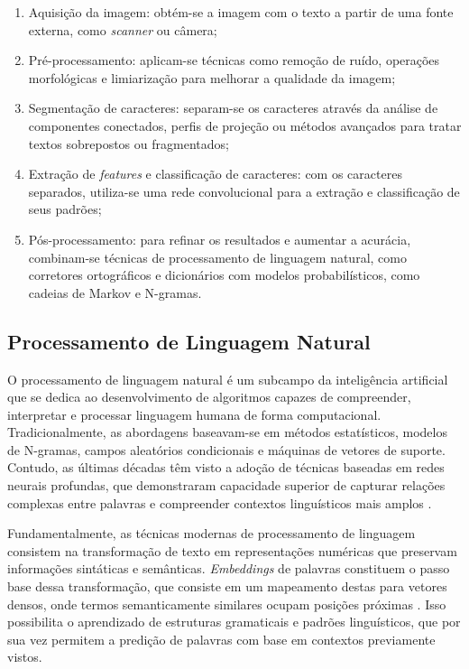 \begin{enumerate}
	\item Aquisição da imagem: obtém-se a imagem com o texto a partir de uma fonte externa, como \textit{scanner} ou câmera;
	\item Pré-processamento: aplicam-se técnicas como remoção de ruído, operações morfológicas e limiarização para melhorar a qualidade da imagem;
	\item Segmentação de caracteres: separam-se os caracteres através da análise de componentes conectados, perfis de projeção ou métodos avançados para tratar textos sobrepostos ou fragmentados;
	\item Extração de \textit{features} e classificação de caracteres: com os caracteres separados, utiliza-se uma rede convolucional para a extração e classificação de seus padrões;
	\item Pós-processamento: para refinar os resultados e aumentar a acurácia, combinam-se técnicas de processamento de linguagem natural, como corretores ortográficos e dicionários com modelos probabilísticos, como cadeias de Markov e N-gramas.
\end{enumerate}

\subsection{Processamento de Linguagem Natural}

O processamento de linguagem natural é um subcampo da inteligência artificial que se dedica ao desenvolvimento de algoritmos capazes de compreender, interpretar e processar linguagem humana de forma computacional. Tradicionalmente, as abordagens baseavam-se em métodos estatísticos, modelos de N-gramas, campos aleatórios condicionais e máquinas de vetores de suporte. Contudo, as últimas décadas têm visto a adoção de técnicas baseadas em redes neurais profundas, que demonstraram capacidade superior de capturar relações complexas entre palavras e compreender contextos linguísticos mais amplos \cite{nlp}.

Fundamentalmente, as técnicas modernas de processamento de linguagem consistem na transformação de texto em representações numéricas que preservam informações sintáticas e semânticas. \textit{Embeddings} de palavras constituem o passo base dessa transformação, que consiste em um mapeamento destas para vetores densos, onde termos semanticamente similares ocupam posições próximas \cite{nlp}. Isso possibilita o aprendizado de estruturas gramaticais e padrões linguísticos, que por sua vez permitem a predição de palavras com base em contextos previamente vistos.

